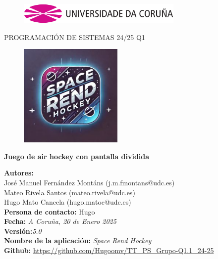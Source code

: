 \documentclass[a4paper,openright,12pt]{article}
\begin{document}
\begin{titlepage}

\begin{center}
\vspace*{-1in}
\begin{figure}[htb]
\begin{center}
\includegraphics[width=8cm]{udc.eps}
\end{center}
\end{figure}

PROGRAMACIÓN DE SISTEMAS 24/25 Q1\\

\begin{figure}[htb]
\begin{center}
\includegraphics[width=5cm]{Images/logo.jpg}
\end{center}
\end{figure}

\vspace*{1in}
\begin{Large}
\textbf{Juego de air hockey con pantalla dividida} \\
\end{Large}

\vspace*{2.5in}

\begin{large}
\raggedright
\textbf{Autores:}\\ José Manuel Fernández Montáns (j.m.fmontans@udc.es) \\
Mateo Rivela Santos (mateo.rivela@udc.es)\\
Hugo Mato Cancela (hugo.matoc@udc.es)\\
\textbf{Persona de contacto:} Hugo\\
\textbf{Fecha:}\textit{ A Coruña, 20 de Enero 2025}\\
\textbf{Versión:}\textit{5.0}\\
\textbf{Nombre de la aplicación:} \textit{Space Rend Hockey}\\
\textbf{Github:} \url{https://github.com/Hugoomv/TT_PS_Grupo-Q1.1_24-25}\\
\end{large}

\end{center}
\end{titlepage} 
\end{document}
